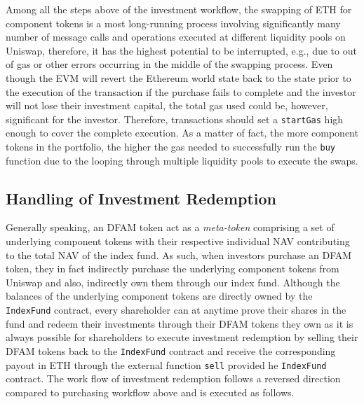 Among all the steps above of the investment workflow, the swapping of ETH for component tokens is a most long-running process involving significantly many number of message calls and operations executed at different liquidity pools on Uniswap, therefore, it has the highest potential to be interrupted, e.g., due to out of gas or other errors occurring in the middle of the swapping process. Even though the EVM will revert the Ethereum world state back to the state prior to the execution of the transaction if the purchase fails to complete and the investor will not lose their investment capital, the total gas used could be, however, significant for the investor. Therefore, transactions should set a \texttt{startGas} high enough to cover the complete execution. As a matter of fact, the more component tokens in the portfolio, the higher the gas needed to successfully run the \texttt{buy} function due to the looping through multiple liquidity pools to execute the swaps.  

\subsection{Handling of Investment Redemption}

Generally speaking, an DFAM token act as a \textit{meta-token} comprising a set of underlying component tokens with their respective individual NAV contributing to the total NAV of the index fund. As such, when investors purchase an DFAM token, they in fact indirectly purchase the underlying component tokens from Uniswap and also, indirectly own them through our index fund. Although the balances of the underlying component tokens are directly owned by the \texttt{IndexFund} contract, every shareholder can at anytime prove their shares in the fund and redeem their investments through their DFAM tokens they own as it is always possible for shareholders to execute investment redemption by selling their DFAM tokens back to the \texttt{IndexFund} contract and receive the corresponding payout in ETH through the external function \texttt{sell} provided he \texttt{IndexFund} contract. The work flow of investment redemption follows a reversed direction compared to purchasing workflow above and is executed as follows.


